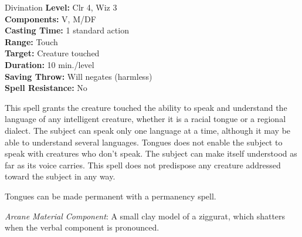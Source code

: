 {Divination}
{
	\textbf{Level:}
	Clr 4, Wiz 3\\
	\textbf{Components:}
	V, M/DF\\
	\textbf{Casting Time:}
	1 standard action\\
	\textbf{Range:}
	Touch\\
	\textbf{Target:}
	Creature touched\\
	\textbf{Duration:}
	10 min./level\\
	\textbf{Saving Throw:}
	Will negates (harmless)\\
	\textbf{Spell Resistance:}
	No\\
}
{
	This spell grants the creature touched the ability to speak and understand the language of any intelligent creature, whether it is a racial tongue or a regional dialect. The subject can speak only one language at a time, although it may be able to understand several languages. Tongues does not enable the subject to speak with creatures who don't speak. The subject can make itself understood as far as its voice carries. This spell does not predispose any creature addressed toward the subject in any way.

	Tongues can be made permanent with a permanency spell.

	\textit{Arcane Material Component}:
	A small clay model of a ziggurat, which shatters when the verbal component is pronounced.

}
